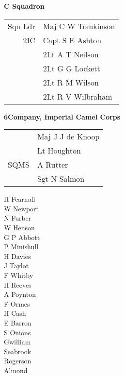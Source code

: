 \vspace*{10mm}

\begin{center}
  \Large
  \textbf{C Squadron}
\end{center}

\begin{center}
  \begin{tabular}{rl}
    Sqn Ldr & Maj C W Tomkinson \\
    2IC & Capt S E Ashton \\
    & 2Lt A T Neilson \\
    & 2Lt G G Lockett \\
    & 2Lt R M Wilson \\
    & 2Lt R V Wilbraham \\
  \end{tabular}
\end{center}

\vspace*{10mm}

\begin{center}
  \Large
  \textbf{6\nth Company, Imperial Camel Corps}
\end{center}

\begin{center}
  \begin{tabular}{rl}
    & Maj J J de Knoop\footnotemark \\
    & Lt Houghton \\
    SQMS & A Rutter \\
    & Sgt N Salmon \\
  \end{tabular}
\end{center}


\begin{multicols}{3}
  \small
  \noindent
  H Fearnall \\
  W Newport \\
  N Furber \\
  W Henson \\
  G P Abbott \\
  P Minishull \\
  H Davies \\
  J Taylot \\
  F Whitby \\
  H Reeves \\
  A Poynton \\
  F Ormes \\
  H Cash \\
  E Barron \\
  S Onions \\
  Gwilliam \\
  Seabrook \\
  Rogerson \\
  Almond \\
\end{multicols}
